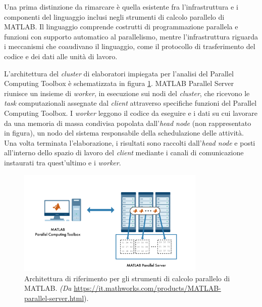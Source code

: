 Una prima distinzione da rimarcare \`e quella esistente fra l'infrastruttura e i componenti del linguaggio inclusi negli strumenti di calcolo parallelo di MATLAB.\newline
Il linguaggio comprende costrutti di programmazione parallela e funzioni con supporto automatico al parallelismo, mentre l'infrastruttura riguarda i meccanismi che coaudivano il linguaggio, come il protocollo di trasferimento del codice e dei dati alle unit\`a di lavoro.

L'architettura del \textit{cluster} di elaboratori impiegata per l'analisi del Parallel Computing Toolbox \`e schematizzata in figura \ref{fig:ArchitetturaRiferimento}.\newline
MATLAB Parallel Server riunisce un insieme di \textit{worker}, in esecuzione sui nodi del \textit{cluster}, che ricevono le
\textit{task} computazionali assegnate dal \textit{client} attraverso specifiche funzioni del Parallel Computing Toolbox. \newline
I \textit{worker} leggono il codice da eseguire e i dati su cui lavorare da una memoria di massa condivisa popolata dall'\textit{head node}
(non rappresentato in figura), un nodo del sistema responsabile della schedulazione delle attivit\`a.\newline
Una volta terminata l'elaborazione, i risultati sono raccolti dall'\textit{head node} e posti all'interno dello spazio di lavoro del \textit{client}
mediante i canali di comunicazione instaurati tra quest'ultimo e i \textit{worker}.

\begin{figure}[htbp]
    \centering
    \includegraphics[width=0.8\textwidth]{../Risorse/Capitolo 2/ReferenceArchitecture.png}
    \caption{Architettura di riferimento per gli strumenti di calcolo parallelo di MATLAB.
        \small{\textit{(Da} \url{https://it.mathworks.com/products/MATLAB-parallel-server.html})}.}
    \label{fig:ArchitetturaRiferimento}
\end{figure}

